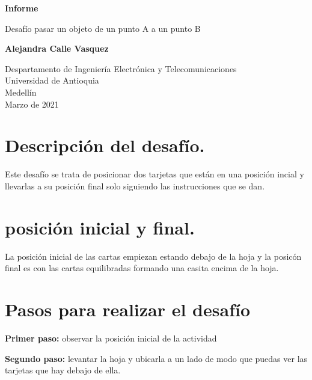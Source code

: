 \documentclass{article}
\begin{document}
\begin{titlepage}
    \begin{center}
        \vspace*{1cm}
            
        \Huge
        \textbf{Informe}
            
        \vspace{0.5cm}
        \LARGE
        Desafío pasar un objeto de un punto A a un punto B
            
        \vspace{1.5cm}
            
        \textbf{Alejandra Calle Vasquez}
            
        \vfill
            
        \vspace{0.8cm}
            
        \Large
        Despartamento de Ingeniería Electrónica y Telecomunicaciones\\
        Universidad de Antioquia\\
        Medellín\\
        Marzo de 2021
            
    \end{center}
\end{titlepage}


\newpage
\section{Descripción del desafío.}\label{descripción}
Este desafío se trata de posicionar dos tarjetas que están en una posición incial y llevarlas a su posición final solo siguiendo las instrucciones que se dan. 
\section{posición inicial y final.}\label{Posiciones}
La posición inicial de las cartas empiezan estando debajo de la hoja y la posicón final es con las cartas equilibradas formando una casita encima de la hoja.
\section{Pasos para realizar el desafío} \label{Pasos}
\textbf{Primer paso: }
observar la posición inicial de la actividad
\vspace{0.3cm}

\textbf{Segundo paso: }
levantar la hoja y ubicarla a un lado de modo que puedas ver las tarjetas que hay debajo de ella.
\vspace{0.3cm}
\end{document}
